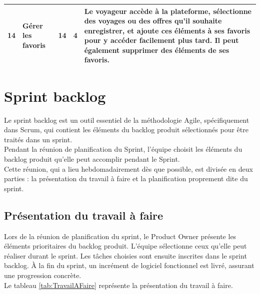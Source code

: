 \documentclass[12pt]{report}
\begin{document}
\begin{longtable}{|p{1cm}|p{3cm}|p{2cm}|p{2cm}|p{6cm}|}
						\\
						\hline
						 14&Gérer les favoris&14&4&
						Le voyageur accède à la plateforme, sélectionne des voyages ou des offres qu'il souhaite enregistrer, et ajoute ces éléments à ses favoris pour y accéder facilement plus tard. Il peut également supprimer des éléments de ses favoris. 
						\\
						\hline
				    \end{longtable}



				\section{Sprint backlog}
	
				\hspace{15pt} Le sprint backlog est un outil essentiel de la méthodologie Agile, spécifiquement dans Scrum, qui contient les éléments du backlog produit sélectionnés pour être traités dans un sprint.\\
	
				Pendant la réunion de planification du Sprint, l'équipe choisit les éléments du backlog produit qu'elle peut accomplir pendant le Sprint.\\

				Cette réunion, qui a lieu hebdomadairement dès que possible, est divisée en deux parties : la présentation du travail à faire et la planification proprement dite du sprint.

				\subsection{Présentation du travail à faire}

				\hspace{15pt} Lors de la réunion de planification du sprint, le Product Owner présente les éléments prioritaires du backlog produit. L'équipe sélectionne ceux qu'elle peut réaliser durant le sprint. Les tâches choisies sont ensuite inscrites dans le sprint backlog. À la fin du sprint, un incrément de logiciel fonctionnel est livré, assurant une progression concrète.\\

				Le tableau \ref{tab:TravailAFaire} représente la présentation du travail à faire.
\end{document}
